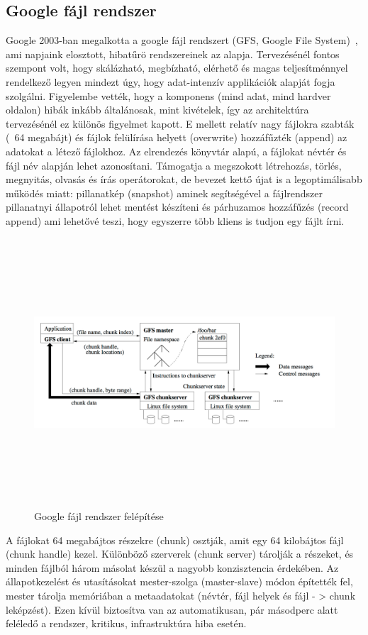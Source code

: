 \documentclass[a4paper,12pt]{article}
\begin{document}
\subsection{Google fájl rendszer}
Google 2003-ban megalkotta a google fájl rendszert (GFS, Google File System)~\cite{gfs}, ami napjaink elosztott, hibatűrö rendszereinek az alapja. Tervezésénél fontos szempont volt, hogy skálázható, megbízható, elérhető és magas teljesítménnyel rendelkező legyen mindezt úgy, hogy adat-intenzív applikációk alapját fogja szolgálni. Figyelembe vették, hogy a komponens (mind adat, mind hardver oldalon) hibák inkább általánosak, mint kivételek, így az architektúra tervezésénél ez különös figyelmet kapott. E mellett relatív nagy fájlokra szabták (~64 megabájt) és fájlok felülírása helyett (overwrite) 
hozzáfűzték (append) az adatokat a létező fájlokhoz. Az elrendezés könyvtár alapú, a fájlokat névtér és fájl név alapján lehet azonosítani. Támogatja a megszokott létrehozás, törlés, megnyitás, olvasás és írás operátorokat, de bevezet kettő újat is a legoptimálisabb működés miatt: pillanatkép (snapshot) aminek segítségével a fájlrendszer pillanatnyi állapotról lehet mentést készíteni és párhuzamos hozzáfűzés (record append) ami lehetővé teszi, hogy egyszerre több kliens is tudjon egy fájlt írni. 

\begin{figure}[ht!]
\centering
\includegraphics[width=130mm, height=100mm, keepaspectratio]{img/gfs.png}
\caption{Google fájl rendszer felépítése \label{gfs}}
\end{figure}

A fájlokat 64 megabájtos részekre (chunk) osztják, amit egy 64 kilobájtos fájl (chunk handle) kezel. Különböző szerverek (chunk server) tárolják a részeket, és minden fájlból három másolat készül a nagyobb konzisztencia érdekében. Az állapotkezelést és utasításokat mester-szolga (master-slave) módon építették fel, mester tárolja memóriában a metaadatokat (névtér, fájl helyek és fájl - > chunk leképzést). Ezen kívül biztosítva van az automatikusan, pár másodperc alatt feléledő a rendszer, kritikus, infrastruktúra hiba esetén.
\end{document}

